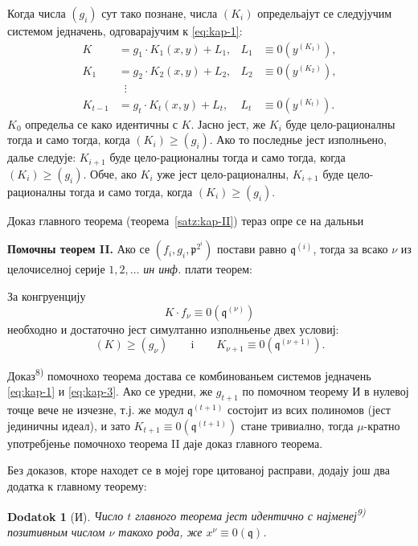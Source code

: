 \documentclass[11pt]{article}
\theoremstyle{plain}
\newtheorem{zusatz}{Dodatok}
\begin{document}
Когда числа $(g_{i})$ сут тако познане, числа $(K_{i})$ определьајут
се следујучим системом једначень, одговарајучим к \eqref{eq:kap-1}:
\begin{equation}\label{eq:kap-3}
\begin{aligned}
K &= g_{1} \cdot K_{1}(x,y) + L_{1}, & L_{1} &\equiv 0(y^{(K_{1})}),\\
K_{1} &= g_{2} \cdot K_{2}(x,y) + L_{2}, & L_{2} &\equiv 0(y^{(K_{2})}),\\
&\;\;\vdots &&\\
K_{t-1} &= g_{t} \cdot K_{t}(x,y) + L_{t}, & L_{t} &\equiv 0(y^{(K_{t})}).
\end{aligned}
\end{equation}
$K_{0}$ определьа се како идентичны с $K$. Јасно јест, же $K_{i}$
буде цело-рационалны тогда и само тогда, когда
$(K_{i}) \geq (g_{i})$. Ако то последнье јест изполньено, далье
следује: $K_{i+1}$ буде цело-рационалны тогда и само тогда, когда
$(K_{i}) \geq (g_{i})$. Обче, ако $K_{i}$ уже јест цело-рационалны,
$K_{i+1}$ буде цело-рационалны тогда и само тогда, когда
$(K_{i}) \geq (g_{i})$.

Доказ главного теорема (теорема~\ref{satz:kap-II}) тераз опре се на
дальньи

\smallskip
\textbf{Помочны теорем II.} Ако се
$(f_{i}, g_{i}, \mathfrak{p}^{2^{i}})$ постави равно
$\mathfrak{q}^{(i)}$, тогда за всако $\nu$ из целочиселној серије
$1, 2, \ldots$ \textit{ин инф.} плати теорем:

За конгруенцију
\[
K \cdot f_{\nu} \equiv 0(\mathfrak{q}^{(\nu)})
\]
необходно и достаточно јест симултанно изполньенье двех условиј:
\[
(K) \geq (g_{\nu}) \qquad \text{i} \qquad K_{\nu+1} \equiv 0(\mathfrak{q}^{(\nu+1)}).
\]

Доказ\textsuperscript{8)} помочнохо теорема достава се комбинованьем
системов једначень \eqref{eq:kap-1} и \eqref{eq:kap-3}. Ако се
уредни, же $g_{t+1}$ по помочном теорему И в нулевој точце вече не
изчезне, т.ј. же модул $\mathfrak{q}^{(t+1)}$ состојит из всих
полиномов (јест јединичны идеал), и зато
$K_{t+1} \equiv 0(\mathfrak{q}^{(t+1)})$ стане тривиално, тогда
$\mu$-кратно употребјенье помочнохо теорема II даје доказ главного
теорема.

\smallskip
Без доказов, кторе находет се в мојеј горе цитованој расправи,
додају још два додатка к главному теорему:

\begin{zusatz}[И]
Число $t$ главного теорема јест идентично с најменеј\textsuperscript{9)}
позитивным числом $\nu$ такохо рода, же
$x^{\nu} \equiv 0(\mathfrak{q})$.
\end{zusatz}
\end{document}
